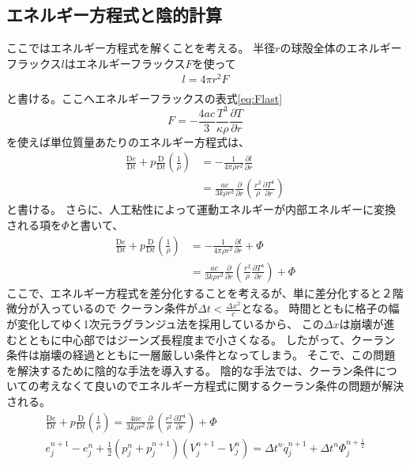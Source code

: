\documentclass[a4j, dvipdfmx]{jsarticle}
\newcommand{\pder}[2][]{\frac{\partial#1}{\partial#2}}
\newcommand{\Dder}[2][]{\frac{\mathrm{D}#1}{\mathrm{D}#2}}
\newcommand{\half}{\frac{1}{2}}
\newcommand{\beq}{\begin{equation}}
\newcommand{\eeq}{\end{equation}}
\begin{document}
\subsection{エネルギー方程式と陰的計算}
ここではエネルギー方程式を解くことを考える。
半径$r$の球殻全体のエネルギーフラックス$l$はエネルギーフラックス$F$を使って
\begin{align}
    l = 4\pi r^2 F\\
\end{align}
と書ける。ここへエネルギーフラックスの表式\eqref{eq:Flast}
\beq
    F = - \frac{4ac}{3} \frac{T^3}{\kappa \rho}\pder[T]{r}
\eeq
を使えば単位質量あたりのエネルギー方程式は、
\begin{align}
    \Dder[e]{t} + p \Dder[]{t}\left(\frac{1}{\rho}\right) &= - \frac{1}{4\pi\rho r^2}\pder[l]{r}\\
                                                          &= 
                                                          \frac{ac}{3k\rho r^2}\pder[]{r}\left(\frac{r^2}{\rho} \pder[T^4]{r} \right)
\end{align}    
と書ける。
さらに、人工粘性によって運動エネルギーが内部エネルギーに変換される項を$\Phi$と書いて、
\begin{align}
    \Dder[e]{t} + p \Dder[]{t}\left(\frac{1}{\rho}\right) &= - \frac{1}{4\pi\rho r^2}\pder[l]{r} + \Phi\\
                                                          &= 
                                                          \frac{ac}{3k\rho r^2}\pder[]{r}\left(\frac{r^2}{\rho} \pder[T^4]{r} \right) + \Phi
\end{align}    
ここで、エネルギー方程式を差分化することを考えるが、単に差分化すると２階微分が入っているので
クーラン条件が$\Delta t < \frac{\Delta x^2}{c}$となる。
時間とともに格子の幅が変化してゆく1次元ラグランジュ法を採用しているから、
この$\Delta x$は崩壊が進むとともに中心部ではジーンズ長程度まで小さくなる。
したがって、クーラン条件は崩壊の経過とともに一層厳しい条件となってしまう。
そこで、この問題を解決するために陰的な手法を導入する。
陰的な手法では、クーラン条件についての考えなくて良いのでエネルギー方程式に関するクーラン条件の問題が解決される。
\begin{align}
    \Dder[e]{t} + p \Dder[]{t}\left(\frac{1}{\rho}\right) 
= \frac{4ac}{3k\rho r^2}\pder[]{r}\left(\frac{r^2}{\rho} \pder[T^4]{r} \right) + \Phi\\
e^{n+1}_j - e^{n}_j + \half (p^n_j + p^{n+1}_j)(V^{n+1}_j - V^n_j) 
= \Delta t^n \dot{q}^{n+1}_j+\Delta t^n \Phi^{n+\half}_j\label{eq:sabun}
\end{align}    
\end{document}
